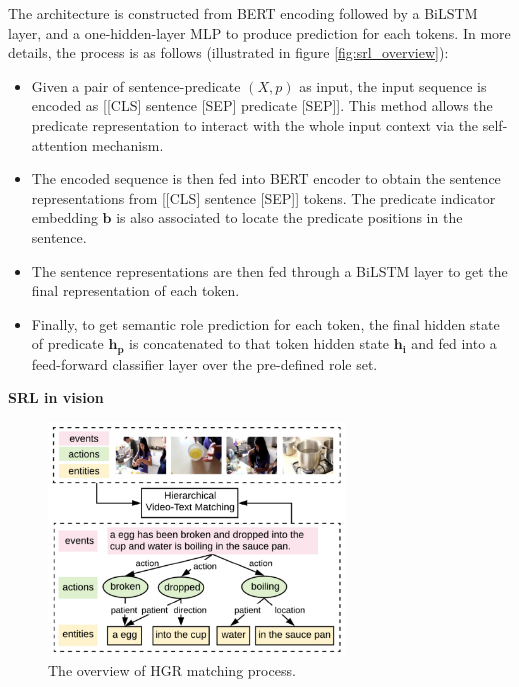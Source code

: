 The architecture is constructed from BERT encoding followed by a BiLSTM layer, and a one-hidden-layer MLP to produce prediction for each tokens. In more details, the process is as follows (illustrated in figure \ref{fig:srl_overview}):
\begin{itemize}
    \item Given a pair of sentence-predicate $(X, p)$ as input, the input sequence is encoded as [[CLS] sentence [SEP] predicate [SEP]]. This method allows the predicate representation to interact with the whole input context via the self-attention mechanism.
    \item The encoded sequence is then fed into BERT encoder to obtain the sentence representations from [[CLS] sentence [SEP]] tokens. The predicate indicator embedding $\mathbf{b}$ is also associated to locate the predicate positions in the sentence.
    \item The sentence representations are then fed through a BiLSTM layer to get the final representation of each token. 
    \item Finally, to get semantic role prediction for each token, the final hidden state of predicate $\mathbf{h_p}$ is concatenated to that token hidden state $\mathbf{h_i}$ and fed into a feed-forward classifier layer over the pre-defined role set.
\end{itemize}

\textbf{SRL in vision} 
\begin{figure}[!htb]
    \centering
    \includegraphics[width=0.7\textwidth]{images/HGR_idea.png}
    \caption{The overview of HGR\cite{chen2020fine} matching process.}
    \label{fig:hgr_overview}
\end{figure}

